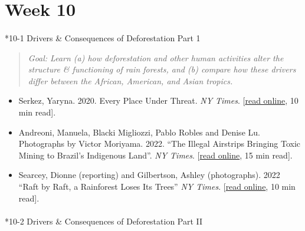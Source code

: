\documentclass[
  10pt,
  letterpaper,
  oneside,
  open=any]{scrbook}
\makeatletter
\let\oldparagraph\paragraph
\renewcommand{\paragraph}{
    \@ifstar
      \xxxParagraphStar
      \xxxParagraphNoStar
  }
\newcommand{\xxxParagraphStar}[1]{\oldparagraph*{#1}\mbox{}}
\newcommand{\xxxParagraphNoStar}[1]{\oldparagraph{#1}\mbox{}}
\makeatother
\begin{document}
\section*{Week 10}\label{week-10}


\paragraph*{10-1 Drivers \& Consequences of Deforestation Part
1}\label{drivers-consequences-of-deforestation-part-1}

\begin{quote}
\emph{Goal: Learn (a) how deforestation and other human activities alter
the structure \& functioning of rain forests, and (b) compare how these
drivers differ between the African, American, and Asian tropics.}
\end{quote}

\begin{itemize}
\item
  Serkez, Yaryna. 2020. Every Place Under Threat. \emph{NY Times}.
  {[}\href{https://www.nytimes.com/interactive/2020/10/02/opinion/amazon-under-threat.html}{read
  online}, 10 min read{]}.
\item
  Andreoni, Manuela, Blacki Migliozzi, Pablo Robles and Denise Lu.
  Photographs by Victor Moriyama. 2022. ``The Illegal Airstrips Bringing
  Toxic Mining to Brazil's Indigenous Land''. \emph{NY Times}.
  {[}\href{https://www.nytimes.com/interactive/2022/08/02/world/americas/brazil-airstrips-illegal-mining.html}{read
  online}, 15 min read{]}.
\item
  Searcey, Dionne (reporting) and Gilbertson, Ashley (photographs). 2022
  ``Raft by Raft, a Rainforest Loses Its Trees'' \emph{NY Times}.
  {[}\href{https://www.nytimes.com/interactive/2022/06/14/climate/congo-rainforest-logging.html}{read
  online}, 10 min read{]}.
\end{itemize}

\paragraph*{10-2 Drivers \& Consequences of Deforestation Part
II}\label{drivers-consequences-of-deforestation-part-ii}
\end{document}
